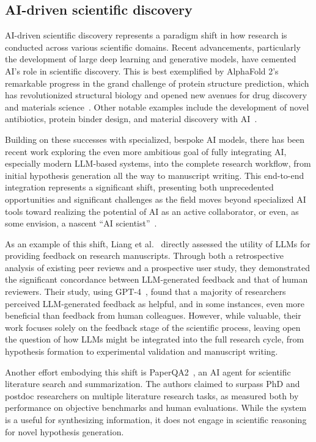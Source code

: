 \subsection{AI-driven scientific discovery}
AI-driven scientific discovery represents a paradigm shift in how research is conducted across various scientific domains. Recent advancements, particularly the development of large deep learning and generative models, have cemented AI's role in scientific discovery. This is best exemplified by AlphaFold 2's remarkable progress in the grand challenge of protein structure prediction, which has revolutionized structural biology and opened new avenues for drug discovery and materials science~\citep{jumper2021highly}. Other notable examples include the development of novel antibiotics, protein binder design,  and material discovery with AI~\citep{wong2024discovery, zambaldi2024novo, merchant2023scaling}. 

Building on these successes with specialized, bespoke AI models, there has been recent work exploring the even more ambitious goal of fully integrating AI, especially modern LLM-based systems, into the complete research workflow, from initial hypothesis generation all the way to manuscript writing. This end-to-end integration represents a significant shift, presenting both unprecedented opportunities and significant challenges as the field moves beyond specialized AI tools toward realizing the potential of AI as an active collaborator, or even, as some envision, a nascent ``AI scientist''~\citep{lu2024ai, schmidgall2025agent}.

As an example of this shift, Liang et al.~\cite{liang2024can} directly assessed the utility of LLMs for providing feedback on research manuscripts. Through both a retrospective analysis of existing peer reviews and a prospective user study, they demonstrated the significant concordance between LLM-generated feedback and that of human reviewers. Their study, using GPT-4~\citep{openai2023gpt4}, found that a majority of researchers perceived LLM-generated feedback as helpful, and in some instances, even more beneficial than feedback from human colleagues. However, while valuable, their work focuses solely on the feedback stage of the scientific process, leaving open the question of how LLMs might be integrated into the full research cycle, from hypothesis formation to experimental validation and manuscript writing.

Another effort embodying this shift is PaperQA2~\citep{skarlinski2024language}, an AI agent for scientific literature search and summarization. The authors claimed to surpass PhD and postdoc researchers on multiple literature research tasks, as measured both by performance on objective benchmarks and human evaluations. While the system is a useful for synthesizing information, it does not engage in scientific reasoning for novel hypothesis generation.

